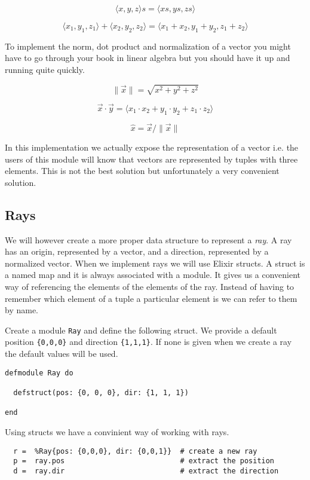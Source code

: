 \documentclass[a4paper,11pt]{article}
\begin{document}
$$\langle x, y, z \rangle  s =  \langle xs, ys, zs \rangle$$

$$\langle x_1, y_1, z_1 \rangle + \langle x_2, y_2, z_2\rangle = \langle x_1+x_2, y_1+y_2, z_1+z_2 \rangle$$

To implement the norm, dot product and normalization of a vector you
might have to go through your book in linear algebra but you should
have it up and running quite quickly.

$$\|\vec{x}\| = \sqrt{x^2 + y^2 + z^2}$$

$$ \vec{x} \cdot \vec{y} = \langle x_1\cdot x_2 + y_1 \cdot y_2 + z_1 \cdot z_2\rangle $$ 

$$ \hat{x} = \vec{x}/\|\vec{x}\|$$

In this implementation we actually expose the representation of a
vector i.e. the users of this module will know that vectors are
represented by tuples with three elements. This is not the best
solution but unfortunately a very convenient solution.

\subsection*{Rays}

We will however create a more proper data structure to represent a {\em ray}. 
A ray has an origin, represented by a vector, and a direction,
represented by a normalized vector. When we implement rays we will use
Elixir structs. A struct is a named map and it is always associated with a module. It gives
us a convenient way of referencing the elements of the elements of the ray. Instead
of having to remember which element of a tuple a particular element
is we can refer to them by name. 

Create a module {\tt Ray} and define the following struct. We provide
a default position {\tt \{0,0,0\}} and direction {\tt \{1,1,1\}}. If
none is given when we create a ray the default values will be used.

\begin{verbatim}
defmodule Ray do

  defstruct(pos: {0, 0, 0}, dir: {1, 1, 1})
  
end
\end{verbatim}

Using structs we have a convinient way of working with rays.


\begin{verbatim}
  r =  %Ray{pos: {0,0,0}, dir: {0,0,1}}  # create a new ray
  p =  ray.pos                           # extract the position
  d =  ray.dir                           # extract the direction
\end{verbatim}
\end{document}
